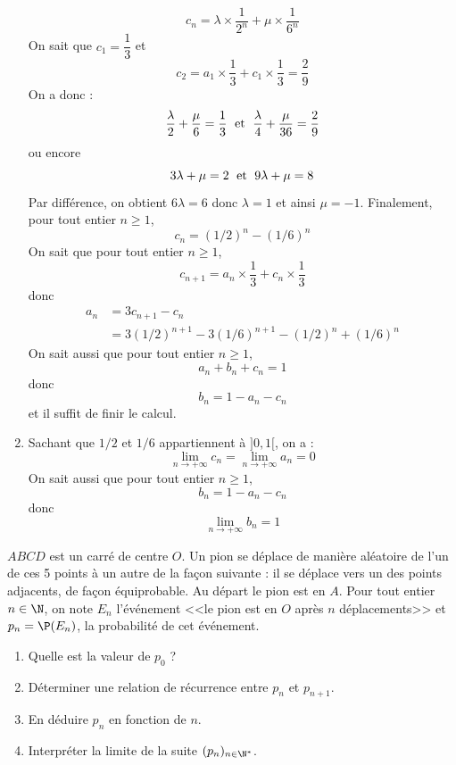 \documentclass[a4paper,10pt]{report}
\begin{document}
\begin{enumerate}
$$ c_n = \lambda \times \dfrac{1}{2^n} + \mu \times \dfrac{1}{6^n}$$
On sait que $c_1= \dfrac{1}{3}$ et 
$$ c_2 = a_1 \times \dfrac{1}{3} + c_1 \times \dfrac{1}{3} = \dfrac{2}{9}$$
On a donc :
$$ \dfrac{\lambda}{2} + \dfrac{\mu}{6} = \dfrac{1}{3} \; \hbox{ et } \; \dfrac{\lambda}{4} + \dfrac{\mu}{36} = \dfrac{2}{9}$$
ou encore 
$$ 3 \lambda + \mu = 2 \; \hbox{ et } \; 9 \lambda + \mu = 8$$
Par différence, on obtient $6 \lambda = 6$ donc $\lambda=1$ et ainsi $\mu=-1$. Finalement, pour tout entier $n \geq 1$,
$$c_n = (1/2)^n-(1/6)^n$$
On sait que pour tout entier $n \geq 1$,
$$c_{n+1} = a_n \times \dfrac{1}{3} + c_n \times \dfrac{1}{3}$$
donc 
\begin{align*}
 a_n & = 3c_{n+1}-c_n  \\
 & = 3 (1/2)^{n+1}-3(1/6)^{n+1} - (1/2)^n+(1/6)^n
 \end{align*}
On sait aussi que pour tout entier $n \geq 1$,
$$ a_n + b_n + c_n  = 1$$
donc 
$$ b_n = 1-a_n -c_n$$
et il suffit de finir le calcul.
\item Sachant que $1/2$ et $1/6$ appartiennent à $]0,1[$, on a :
$$ \lim_{n \rightarrow + \infty} c_n =  \lim_{n \rightarrow + \infty} a_n = 0$$
On sait aussi que pour tout entier $n \geq 1$,
$$  b_n = 1-a_n -c_n$$
donc 
$$\lim_{n \rightarrow + \infty} b_n = 1$$
\end{enumerate}


\begin{Exercice}{} $ABCD$ est un carré de centre $O$. Un pion se déplace de manière aléatoire de l'un de ces 5 points à un autre de la façon suivante : il se déplace vers un des points adjacents, de façon équiprobable. Au départ le pion est en $A$. Pour tout entier $n \in \N$, on note $E_n$ l'événement <<le pion est en $O$ après $n$ déplacements>> et $p_n = \P(E_n)$, la probabilité de cet événement.
\begin{center}\end{center}
\begin{enumerate}
 \item Quelle est la valeur de $p_0$ ?
 \item Déterminer une relation de récurrence entre $p_n$ et $p_{n+1}$.
 \item En déduire $p_n$ en fonction de $n$.
 \item Interpréter la limite de la suite $(p_n)_{n\in \N^*}$.
\end{enumerate}
\end{Exercice}
\end{document}
